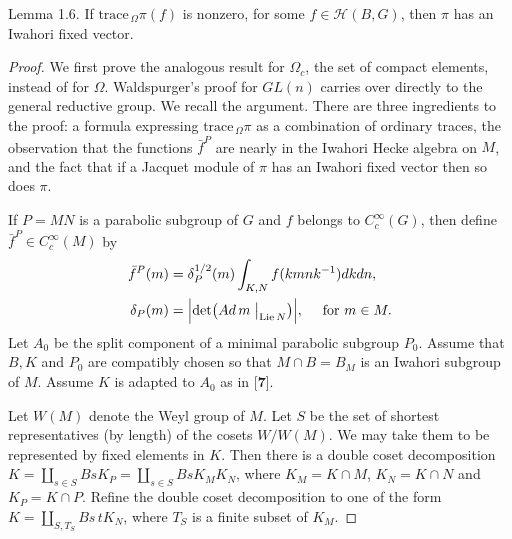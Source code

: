 \documentclass{amsart}
\begin{document}
\proclaim Lemma {1.6}.
If
  $ \text{trace}_{\,\Omega}\pi (f) $ is nonzero, 
for some 
  $ f \in \mathcal H (B, G) $,
then
  $ \pi $
has an Iwahori fixed vector.
\finishproclaim

\begin{proof}
We first prove the analogous result for $\Omega_c$, the set of 
compact elements, instead of for $\Omega$.
Waldspurger's proof for 
  $ GL(n) $
carries over directly to the general reductive group.
We recall the argument.
There are three ingredients to the proof:
a formula expressing
  $ \text{trace}_{\,\Omega} \pi $
as a combination of ordinary traces, 
the observation that the functions 
  $ \bar f^P $
are nearly in the Iwahori Hecke algebra on $M$,
and the fact that if a Jacquet module of
  $ \pi $
has an Iwahori fixed vector then so does 
  $ \pi $.

If
  $ P = MN $
is a parabolic subgroup of $G$ and
  $ f$ belongs to $C_c^{\infty} (G) $, then
define 
  $ \bar f^P \in C_c^{\infty} (M) $
by
%
\begin{align*}
  \bar f^P (m) &=
    \delta_P^{1/2} (m)
    \int_{K,N}
    f (kmnk^{-1}) dkdn, \\
\vspace{4pt}
  \delta_P(m) &=
     \Bigl|
       \det
       \bigl(
          Ad\,m \bigm|_{\text{Lie}\,N}
       \bigr)
     \Bigr|,
     \quad\text { for }
     m \in M.
\end{align*}
%
Let $A_0$ be the split component of a minimal parabolic subgroup
  $P_0$.  Assume that $ B, K$ and $P_0 $ are compatibly chosen so that
  $ M \cap B = B_M $ is an Iwahori subgroup of $M$.  Assume $K$ is
  adapted to $ A_0 $ as in [{\bf 7}].

Let $W (M)$ denote the Weyl group of $M$.
Let $S$ be the set of shortest representatives (by length)
of the cosets 
  $ W/W(M) $.
We may take them to be represented by fixed elements in $K$.
Then there is a double coset decomposition
  $ K = 
    \coprod_{s \in S} 
      B s K_P =
    \coprod_{s \in S }
      B s K_M K_N $,
where 
  $ K_M =
    K \cap M $,
  $ K_N = K \cap N $ and
  $ K_P = K \cap P $.
Refine the double coset decomposition to one of the form
$K=\coprod_{S,T_S} B s\,t K_N$, where $T_S$ is a finite
subset of $K_M$.   


\end{proof}
\end{document}

